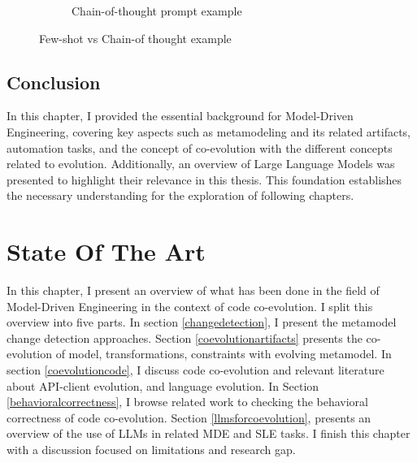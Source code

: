 \begin{itemize}
\begin{figure}[t!]
\begin{subfigure}[t]{0.5\linewidth}
			\caption{Chain-of-thought prompt example}
			\label{fig:cotexample}
		\end{subfigure}
		\caption{ Few-shot vs Chain-of thought example }
	\end{figure}
	
	
	
\end{itemize}
\section{Conclusion}
In this chapter, I provided the essential background for Model-Driven Engineering, covering key aspects such as metamodeling and its related artifacts, automation tasks, and the concept of co-evolution with the different concepts related to evolution. Additionally, an overview of Large Language Models was presented to highlight their relevance in this thesis. This foundation establishes the necessary understanding for the exploration of following chapters.

\chapter{State Of The Art}

In this chapter, I present an overview of what has been done in the field of Model-Driven Engineering in the context of code co-evolution. I split this overview into five  parts. In section \ref{changedetection}, I present the metamodel change detection approaches. Section \ref{coevolutionartifacts} presents the co-evolution of model, transformations, constraints with evolving metamodel. In section \ref{coevolutioncode}, I discuss code co-evolution and relevant literature about API-client evolution, and language evolution. In Section \ref{behavioralcorrectness}, I browse related work to checking the behavioral correctness of code co-evolution. Section \ref{llmsforcoevolution}, presents an overview of the use of LLMs in related MDE and SLE tasks. I finish this chapter with a discussion focused on limitations and research gap.
